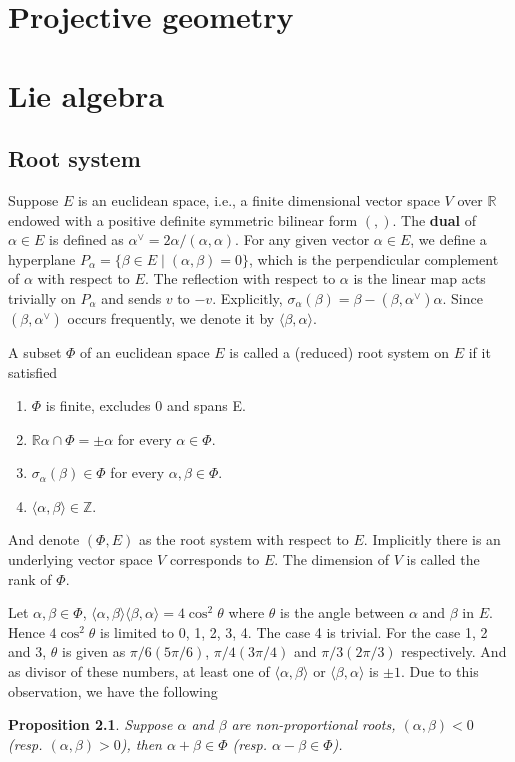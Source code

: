\documentclass{amsbook}
\newtheorem{proposition}[theorem]{Proposition}
\theoremstyle{definition}
\theoremstyle{remark}
\newcommand{\Z}{\mathbb{Z}}
\newcommand{\R}{\mathbb{R}}
\newcommand{\cartan}[2]{\langle {#1}, {#2} \rangle}
\numberwithin{section}{chapter}
\numberwithin{equation}{chapter}
\begin{document}
\chapter{Projective geometry}

\chapter{Lie algebra}


\section{Root system}
Suppose $E$ is an euclidean space, i.e., a finite dimensional vector space $V$ over $\R$ endowed with a positive definite symmetric bilinear form $(,)$. The \textbf{dual} of $\alpha\in E$ is defined as $\alpha^\vee = 2\alpha/(\alpha, \alpha)$. For any given vector $\alpha\in E$, we define a hyperplane $P_\alpha = \{\beta\in E \mid (\alpha, \beta) = 0\}$, which is the perpendicular complement of $\alpha$ with respect to $E$. The reflection with respect to $\alpha$ is the linear map acts trivially on $P_\alpha$ and sends $v$ to $-v$. Explicitly, $\sigma_\alpha(\beta) = \beta - (\beta, \alpha^\vee)\alpha$. Since $(\beta, \alpha^\vee)$ occurs frequently, we denote it by $\cartan{\beta}{\alpha}$. 



A subset $\Phi$ of an euclidean space $E$ is called a (reduced) root system on $E$ if it satisfied
\begin{enumerate}
	\item $\Phi$ is finite, excludes 0 and spans E.
	\item $\R\alpha \cap \Phi = {\pm \alpha}$ for every $\alpha \in \Phi$.
	\item $\sigma_{\alpha}(\beta) \in \Phi$ for every $\alpha, \beta \in \Phi$.
	\item $\cartan{\alpha}{\beta} \in \Z$.  
\end{enumerate}
And denote $(\Phi, E)$ as the root system with respect to $E$. Implicitly there is an underlying vector space $V$ corresponds to $E$. The dimension of $V$ is called the rank of $\Phi$.


Let $\alpha, \beta\in\Phi$, $\cartan{\alpha}{\beta}\cartan{\beta}{\alpha} = 4\cos^2\theta$ where $\theta$ is the angle between $\alpha$ and $\beta$ in $E$. Hence $4\cos^2\theta$ is limited to 0, 1, 2, 3, 4. The case 4 is trivial. For the case 1, 2 and 3, $\theta$ is given as $\pi/6(5\pi/6)$, $\pi/4(3\pi/4)$ and $\pi/3(2\pi/3)$ respectively. And as divisor of these numbers, at least one of $\cartan{\alpha}{\beta}$ or $\cartan{\beta}{\alpha}$ is $\pm1$. Due to this observation, we have the following 
\begin{proposition}\label {6.1}
Suppose $\alpha$ and $\beta$ are non-proportional roots, $(\alpha, \beta) < 0$ (resp. $(\alpha, \beta) > 0$), then $\alpha + \beta \in \Phi$ (resp. $\alpha - \beta \in \Phi$).
\end{proposition}
\end{document}
